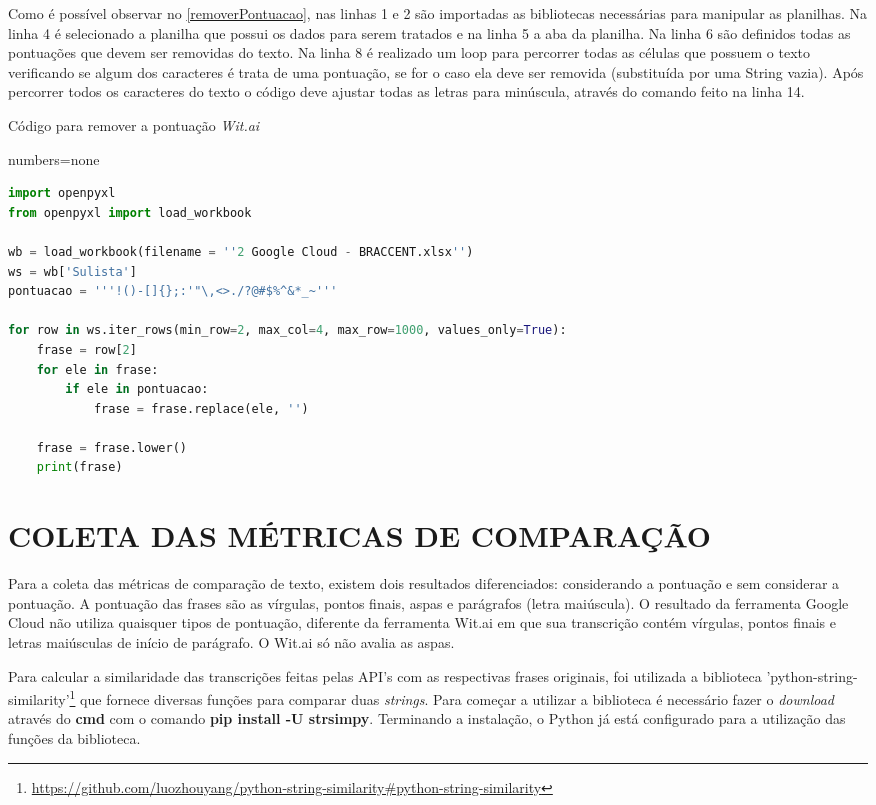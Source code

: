 Como é possível observar no \autoref{removerPontuacao}, nas linhas 1 e 2 são importadas as bibliotecas necessárias para manipular as planilhas. Na linha 4 é selecionado a planilha que possui os dados para serem tratados e na linha 5 a aba da planilha. Na linha 6 são definidos todas as pontuações que devem ser removidas do texto. Na linha 8 é realizado um loop para percorrer todas as células que possuem o texto verificando se algum dos caracteres é trata de uma pontuação, se for o caso ela deve ser removida (substituída por uma String vazia). Após percorrer todos os caracteres do texto o código deve ajustar todas as letras para minúscula, através do comando feito na linha 14.

\begin{quadro}[h]
\centering
\caption{Código para remover a pontuação \emph{Wit.ai}}
\label{removerPontuacao}
{numbers=none}
\begin{lstlisting}[language=Python]
import openpyxl
from openpyxl import load_workbook

wb = load_workbook(filename = ''2 Google Cloud - BRACCENT.xlsx'')
ws = wb['Sulista']
pontuacao = '''!()-[]{};:'"\,<>./?@#$%^&*_~'''

for row in ws.iter_rows(min_row=2, max_col=4, max_row=1000, values_only=True):
    frase = row[2]
    for ele in frase:  
        if ele in pontuacao:  
            frase = frase.replace(ele, '')  
    
    frase = frase.lower()
    print(frase)
\end{lstlisting}
\end{quadro}



\section{COLETA DAS MÉTRICAS DE COMPARAÇÃO}

Para a coleta das métricas de comparação de texto, existem dois resultados diferenciados: considerando a pontuação e sem considerar a pontuação. A pontuação das frases são as vírgulas, pontos finais, aspas e parágrafos (letra maiúscula). O resultado da ferramenta Google Cloud não utiliza quaisquer tipos de pontuação, diferente da ferramenta Wit.ai em que sua transcrição contém vírgulas, pontos finais e letras maiúsculas de início de parágrafo. O Wit.ai só não avalia as aspas. 

Para calcular a similaridade das transcrições feitas pelas API's com as respectivas frases originais, foi utilizada a biblioteca 'python-string-similarity'\footnote{\url{ https://github.com/luozhouyang/python-string-similarity\#python-string-similarity}} que fornece diversas funções para comparar duas \textit{strings}. Para começar a utilizar a biblioteca é necessário fazer o \textit{download}  através do \textbf{cmd} com o comando \textbf{pip install -U strsimpy}. Terminando a instalação, o Python já está configurado para a utilização das funções da biblioteca.


